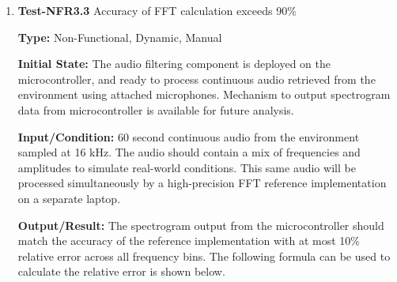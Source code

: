 \documentclass[12pt, titlepage]{article}
\begin{document}
\begin{enumerate}
\textbf{Input/Condition:} 
Digital audio signals of varying sizes: 512, 1024, 2048 and 4096 frames, all
sampled at 16 kHz. Each input contains an arbitrary test signal (sine wave with
arbitrary frequency). 
					
\textbf{Output/Result:} 
For each input size, the Audio Filtering component should process all frames
without exceeding time constraints defined in \hyperref[SRS-NFR1_2]{NFR1.2}
(processing must keep pace with 16 kHz input rate, i.e., process 16,000 samples
per second or faster).

\textbf{Pass Criteria:}
\begin{itemize}
\item Processing rate $\geq$ 16,000 samples/second for all input sizes
\item No frame drops or buffer overflows detected
\end{itemize}
					
\textbf{How test will be performed:} 
Manually upload each audio file to the microcontroller and trigger processing.
Execution time will be measured using microcontroller logs. After processing is
complete, logs will be manually inspected to verify the processing time for each
input size meets the pass criteria (processing rate $\geq$ 16,000 
samples/second).

\item{\textbf{Test-NFR3.3} Accuracy of FFT calculation exceeds 90\%\\}

\textbf{Type:} Non-Functional, Dynamic, Manual
					
\textbf{Initial State:} 
The audio filtering component is deployed on the microcontroller, and ready to
process continuous audio retrieved from the environment using attached
microphones. Mechanism to output spectrogram data from microcontroller is
available for future analysis.
					
\textbf{Input/Condition:} 
60 second continuous audio from the environment sampled at 16 kHz. The audio
should contain a mix of frequencies and amplitudes to simulate real-world
conditions. This same audio will be processed simultaneously by a high-precision
FFT reference implementation on a separate laptop.
					
\textbf{Output/Result:} 
The spectrogram output from the microcontroller should match the accuracy of the
reference implementation with at most 10\% relative error across all frequency
bins. The following formula can be used to calculate the relative error is shown
below. 


\end{enumerate}
\end{document}
